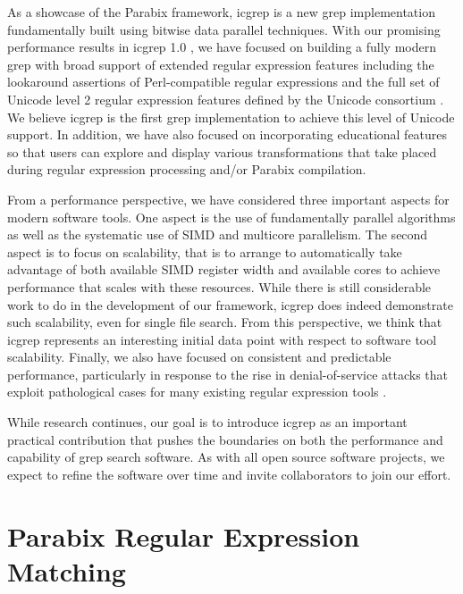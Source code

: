 \documentclass{article}
\begin{document}
As a showcase of the Parabix framework, icgrep is a new grep
implementation fundamentally built using bitwise data parallel
techniques.   With our promising performance results in icgrep 1.0 \cite{cameron2015bitwise},
we have focused on building a fully modern grep with broad
support of extended regular expression features including 
the lookaround assertions of Perl-compatible regular expressions
and the full set of Unicode level 2 regular expression features
defined by the Unicode consortium \cite{davis2016unicode}.   We believe icgrep is the first
grep implementation to achieve this level of Unicode support.
In addition, we have also focused on incorporating educational
features so that users can explore and display various transformations
that take placed during regular expression processing and/or 
Parabix compilation.

From a performance perspective, we have considered three important
aspects for modern software tools.    One aspect is the
use of fundamentally parallel algorithms as well as the systematic
use of SIMD and multicore parallelism.   The second aspect is to
focus on scalability, that is to arrange to automatically take
advantage of both available SIMD register width and available
cores to achieve performance that scales with these resources.
While there is still considerable work to do in the development of 
our framework, icgrep does indeed demonstrate such scalability, 
even for single file search.
From this perspective, we think that icgrep represents an interesting
initial data point with respect to software tool scalability.
Finally, we also have focused on consistent and predictable performance,
particularly in response to the rise in denial-of-service attacks
that exploit pathological cases for many existing regular expression
tools \cite{kirrage2013static}.

While research continues, our goal is to introduce icgrep as
an important practical contribution that pushes the boundaries
on both the performance and capability of grep search software.
As with all open source software projects, we expect to refine
the software over time and invite collaborators to join our
effort.

\section{Parabix Regular Expression Matching}


\printbibliography
\end{document}
